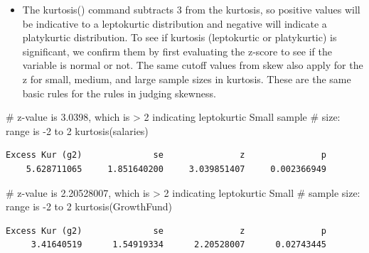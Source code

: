 \documentclass[
  letterpaper,
  DIV=11,
  numbers=noendperiod]{scrreprt}
\newenvironment{Shaded}{\begin{snugshade}}{\end{snugshade}}
\newcommand{\CommentTok}[1]{\textcolor[rgb]{0.37,0.37,0.37}{#1}}
\newcommand{\FunctionTok}[1]{\textcolor[rgb]{0.28,0.35,0.67}{#1}}
\newcommand{\NormalTok}[1]{\textcolor[rgb]{0.00,0.23,0.31}{#1}}
\newcommand{\SpecialCharTok}[1]{\textcolor[rgb]{0.37,0.37,0.37}{#1}}
\providecommand{\tightlist}{%
  \setlength{\itemsep}{0pt}\setlength{\parskip}{0pt}}\usepackage{longtable,booktabs,array}
\begin{document}
\begin{itemize}
\tightlist
\item
  The kurtosis() command subtracts 3 from the kurtosis, so positive
  values will be indicative to a leptokurtic distribution and negative
  will indicate a platykurtic distribution. To see if kurtosis
  (leptokurtic or platykurtic) is significant, we confirm them by first
  evaluating the z-score to see if the variable is normal or not. The
  same cutoff values from skew also apply for the z for small, medium,
  and large sample sizes in kurtosis. These are the same basic rules for
  the rules in judging skewness.
\end{itemize}

\begin{Shaded}
\begin{Highlighting}[]
\CommentTok{\# z{-}value is 3.0398, which is \textgreater{} 2 indicating leptokurtic Small sample}
\CommentTok{\# size: range is {-}2 to 2}
\FunctionTok{kurtosis}\NormalTok{(salaries)}
\end{Highlighting}
\end{Shaded}

\begin{verbatim}
Excess Kur (g2)              se               z               p 
    5.628711065     1.851640200     3.039851407     0.002366949 
\end{verbatim}

\begin{Shaded}
\begin{Highlighting}[]
\CommentTok{\# z{-}value is 2.20528007, which is \textgreater{} 2 indicating leptokurtic Small}
\CommentTok{\# sample size: range is {-}2 to 2}
\FunctionTok{kurtosis}\NormalTok{(GrowthFund)}
\end{Highlighting}
\end{Shaded}

\begin{verbatim}
Excess Kur (g2)              se               z               p 
     3.41640519      1.54919334      2.20528007      0.02743445 
\end{verbatim}

\begin{Shaded}
\end{Shaded}
\end{document}
